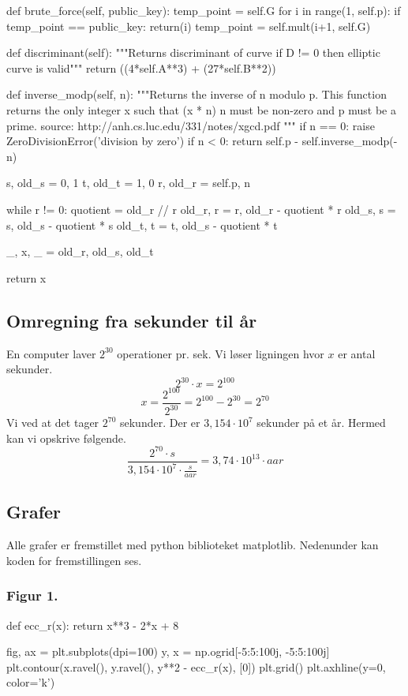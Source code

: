 \begin{python}
	def brute_force(self, public_key):
		temp_point = self.G
		for i in range(1, self.p):
			if temp_point == public_key:
				return(i)
			temp_point = self.mult(i+1, self.G)

	def discriminant(self):
		"""Returns discriminant of curve 
		if D != 0 then elliptic curve is valid"""
		return ((4*self.A**3) + (27*self.B**2)) %

	def inverse_modp(self, n):
		"""Returns the inverse of n modulo p.
			This function returns the only integer x such that (x * n) %
			n must be non-zero and p must be a prime.
			source: http://anh.cs.luc.edu/331/notes/xgcd.pdf
		"""
		if n == 0:
			raise ZeroDivisionError('division by zero')
		if n < 0:
			return self.p - self.inverse_modp(-n)

		s, old_s = 0, 1
		t, old_t = 1, 0
		r, old_r = self.p, n

		while r != 0:
			quotient = old_r // r
			old_r, r = r, old_r - quotient * r
			old_s, s = s, old_s - quotient * s
			old_t, t = t, old_s - quotient * t

		_, x, _ = old_r, old_s, old_t

		return x %
\end{python}

\subsection{Omregning fra sekunder til år}
\label{section:omregning}
En computer laver $2^{30}$ operationer pr. sek. Vi løser ligningen hvor $x$ er antal sekunder.
$$2^{30} \cdot x = 2^{100}$$
$$x=\frac{2^{100}}{2^{30}}=2^{100}-2^{30}=2^{70}$$
Vi ved at det tager $2^{70}$ sekunder. Der er $3,154\cdot 10^7$ sekunder på et år. Hermed kan vi opskrive følgende.
$$\frac{2^{70}\cdot s}{3,154 \cdot 10^7 \cdot \frac{s}{aar}} = 3,74\cdot 10^{13}\cdot aar$$

\subsection{Grafer}
Alle grafer er fremstillet med python biblioteket matplotlib. Nedenunder kan koden for fremstillingen ses.

\subsubsection{Figur 1.}
\label{section:figur_1}
\begin{python}
def ecc_r(x):
    return x**3 - 2*x + 8

fig, ax = plt.subplots(dpi=100)
y, x = np.ogrid[-5:5:100j, -5:5:100j]
plt.contour(x.ravel(), y.ravel(), y**2 - ecc_r(x), [0])
plt.grid()
plt.axhline(y=0, color='k')
\end{python}

